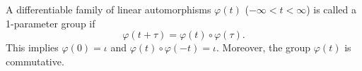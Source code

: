 A differentiable family of linear automorphisms $\varphi(t)$ ($-\infty < t < \infty$) is called a 1-parameter group if
$$\varphi(t + \tau) = \varphi(t) \circ \varphi(\tau).$$
This implies $\varphi(0) = \iota$ and $\varphi(t) \circ \varphi(-t) = \iota$. Moreover, the group $\varphi(t)$ is commutative.
